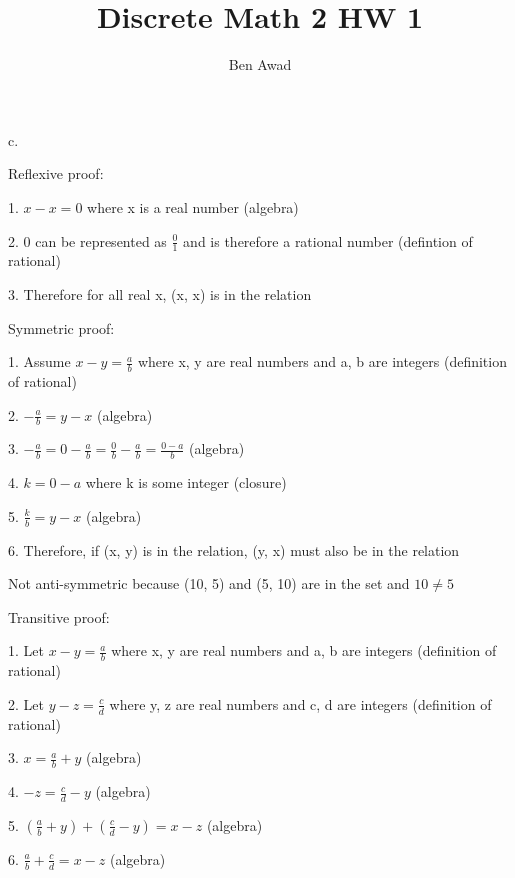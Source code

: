 \documentclass[12pt]{article}
\newenvironment{problem}[2][Problem]{\begin{trivlist}
\item[\hskip \labelsep {\bfseries #1}\hskip \labelsep {\bfseries #2.}]}{\end{trivlist}}
\begin{document}
 
 
\title{Discrete Math 2 HW 1}
\author{Ben Awad}
\maketitle
 
\begin{problem}{9.1.6}
\end{problem}
c. 

Reflexive proof:

1. $x - x = 0$ where x is a real number (algebra)

2. 0 can be represented as $\frac{0}{1}$ and is therefore a rational number (defintion of rational)

3. Therefore for all real x, (x, x) is in the relation

Symmetric proof:

1. Assume $x - y = \frac{a}{b}$ where x, y are real numbers and a, b are integers (definition of rational)

2. $-\frac{a}{b} = y - x$ (algebra)

3. $-\frac{a}{b} = 0 - \frac{a}{b} = \frac{0}{b} - \frac{a}{b} = \frac{0-a}{b}$ (algebra)

4. $k = 0-a$ where k is some integer (closure) 

5. $\frac{k}{b} = y - x$ (algebra)

6. Therefore, if (x, y) is in the relation, (y, x) must also be in the relation

Not anti-symmetric because (10, 5) and (5, 10) are in the set and $10 \neq 5$

Transitive proof:

1. Let $x - y = \frac{a}{b}$ where x, y are real numbers and a, b are integers (definition of rational)

2. Let $y - z = \frac{c}{d}$ where y, z are real numbers and c, d are integers (definition of rational)

3. $x = \frac{a}{b} + y$ (algebra)

4. $-z = \frac{c}{d} - y$ (algebra)

5. $(\frac{a}{b} + y) + (\frac{c}{d} - y) = x - z$ (algebra)

6. $\frac{a}{b} + \frac{c}{d} = x - z$ (algebra)
\end{document}
